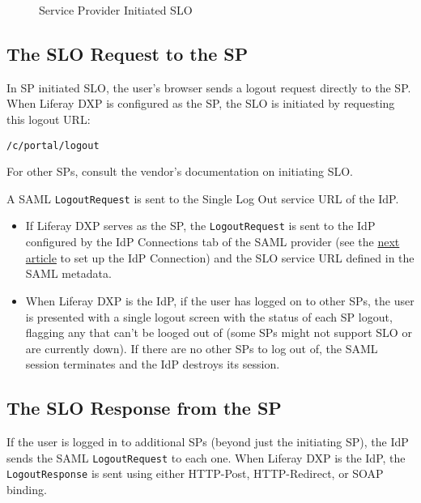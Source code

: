 \begin{figure}
\centering
{}
\caption{Service Provider Initiated SLO}
\end{figure}

\subsection{The SLO Request to the SP}\label{the-slo-request-to-the-sp}

In SP initiated SLO, the user's browser sends a logout request directly
to the SP. When Liferay DXP is configured as the SP, the SLO is
initiated by requesting this logout URL:

\begin{verbatim}
/c/portal/logout
\end{verbatim}

For other SPs, consult the vendor's documentation on initiating SLO.

A SAML \texttt{LogoutRequest} is sent to the Single Log Out service URL
of the IdP.

\begin{itemize}
\item
  If Liferay DXP serves as the SP, the \texttt{LogoutRequest} is sent to
  the IdP configured by the IdP Connections tab of the SAML provider
  (see the
  \href{/docs/7-2/deploy/-/knowledge_base/d/setting-up-liferay-as-a-saml-identity-provider}{next
  article} to set up the IdP Connection) and the SLO service URL defined
  in the SAML metadata.
\item
  When Liferay DXP is the IdP, if the user has logged on to other SPs,
  the user is presented with a single logout screen with the status of
  each SP logout, flagging any that can't be looged out of (some SPs
  might not support SLO or are currently down). If there are no other
  SPs to log out of, the SAML session terminates and the IdP destroys
  its session.
\end{itemize}

\subsection{The SLO Response from the
SP}\label{the-slo-response-from-the-sp-1}

If the user is logged in to additional SPs (beyond just the initiating
SP), the IdP sends the SAML \texttt{LogoutRequest} to each one. When
Liferay DXP is the IdP, the \texttt{LogoutResponse} is sent using either
HTTP-Post, HTTP-Redirect, or SOAP binding.

